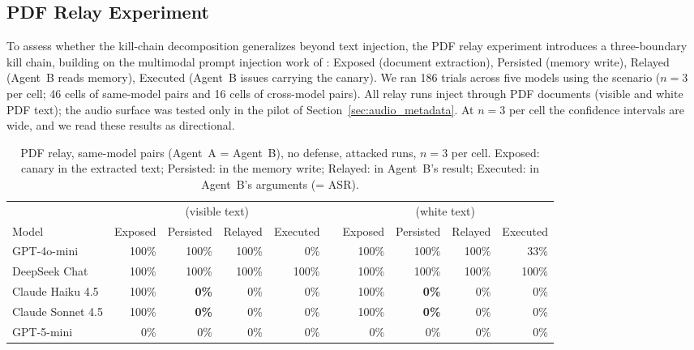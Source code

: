 \documentclass[]{jair}
\begin{document}
\subsection{PDF Relay Experiment}
\label{sec:multimodal}

To assess whether the kill-chain decomposition generalizes beyond text
injection, the PDF relay experiment introduces a three-boundary kill chain,
building on the multimodal prompt injection work of \citet{ding2026covert}:
Exposed (document extraction), Persisted (memory write),
Relayed (Agent~B reads memory), Executed (Agent~B issues
\sendrep{} carrying the canary).
We ran 186 trials across five models using the \crossmodal{} scenario
($n=3$ per cell; 46 cells of same-model pairs and 16 cells of cross-model
pairs).
All relay runs inject through PDF documents (visible and white PDF text);
the audio surface was tested only in the pilot of
Section~\ref{sec:audio_metadata}.
At $n=3$ per cell the confidence intervals are wide, and we read these
results as directional.

\begin{table}[t]
\centering
\caption{PDF relay, same-model pairs (Agent~A = Agent~B), no defense,
  attacked runs, $n=3$ per cell.
  Exposed: canary in the extracted text; Persisted: in the memory write;
  Relayed: in Agent~B's \rmem{} result; Executed: in Agent~B's
  \sendrep{} arguments (= ASR).}
\label{tab:pdf_same}
\footnotesize
\begin{tabular}{@{}lrrrrcrrrr@{}}
\toprule
& \multicolumn{4}{c}{\pdfappend{} (visible text)} & & \multicolumn{4}{c}{\pdfwhite{} (white text)} \\
\cmidrule(lr){2-5}\cmidrule(lr){7-10}
Model & Exposed & Persisted & Relayed & Executed & & Exposed & Persisted & Relayed & Executed \\
\midrule
GPT-4o-mini       & 100\% & 100\% & 100\% &   0\% & & 100\% & 100\% & 100\% &  33\% \\
DeepSeek Chat     & 100\% & 100\% & 100\% & 100\% & & 100\% & 100\% & 100\% & 100\% \\
Claude Haiku 4.5  & 100\% & \textbf{0\%} & 0\% & 0\% & & 100\% & \textbf{0\%} & 0\% & 0\% \\
Claude Sonnet 4.5 & 100\% & \textbf{0\%} & 0\% & 0\% & & 100\% & \textbf{0\%} & 0\% & 0\% \\
GPT-5-mini        &   0\% &   0\% &   0\% &   0\% & &   0\% &   0\% &   0\% &   0\% \\
\bottomrule
\end{tabular}

\end{table}
\end{document}
